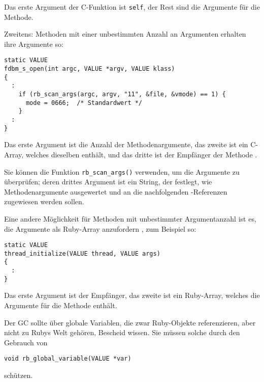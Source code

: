 \noindent Das erste Argument der C-Funktion ist \verb+self+, der Rest
sind die Argumente für die Methode.

Zweitens: Methoden mit einer unbestimmten Anzahl an Argumenten
 erhalten
ihre Argumente so:

\begin{lstlisting}
static VALUE
fdbm_s_open(int argc, VALUE *argv, VALUE klass)
{
  :
    if (rb_scan_args(argc, argv, "11", &file, &vmode) == 1) {
      mode = 0666;  /* Standardwert */
    }
  :
}
\end{lstlisting}

\noindent Das erste Argument ist die Anzahl der Methodenargumente, das
zweite ist ein C-Array, welches dieselben enthält, und das dritte ist
der Empfänger der Methode .

Sie können die Funktion \verb+rb_scan_args()+ verwenden, um die
Argumente zu überprüfen; deren drittes Argument ist ein String, der
festlegt, wie Methodenargumente ausgewertet und an die nachfolgenden
\VALUE-Referenzen zugewiesen werden sollen. 

Eine andere Möglichkeit für Methoden mit unbestimmter Argumentanzahl
ist es, die Argumente als Ruby-Array anzufordern , zum Beispiel so:

\begin{lstlisting}
static VALUE
thread_initialize(VALUE thread, VALUE args)
{
  :
}
\end{lstlisting}

\noindent Das erste Argument ist der Empfänger, das zweite ist ein
Ruby-Array, welches die Argumente für die Methode enthält.

\begin{notice}
  Der GC sollte über globale Variablen, die zwar Ruby-Objekte
  referenzieren, aber nicht zu Rubys Welt gehören, Bescheid wissen. Sie
  müssen solche durch den Gebrauch von

  \begin{lstlisting}
void rb_global_variable(VALUE *var)
  \end{lstlisting}

  \noindent schützen.
\end{notice}

